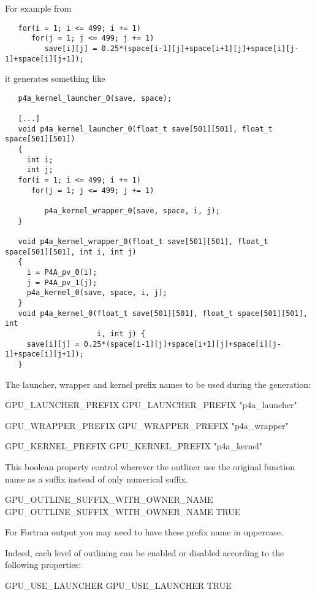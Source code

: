 \documentclass[a4paper]{report}
\begin{document}
For example from
\begin{lstlisting}
   for(i = 1; i <= 499; i += 1)
      for(j = 1; j <= 499; j += 1)
         save[i][j] = 0.25*(space[i-1][j]+space[i+1][j]+space[i][j-1]+space[i][j+1]);
\end{lstlisting}
it generates something like
\begin{lstlisting}
   p4a_kernel_launcher_0(save, space);

   [...]
   void p4a_kernel_launcher_0(float_t save[501][501], float_t space[501][501])
   {
     int i;
     int j;
   for(i = 1; i <= 499; i += 1)
      for(j = 1; j <= 499; j += 1)

         p4a_kernel_wrapper_0(save, space, i, j);
   }

   void p4a_kernel_wrapper_0(float_t save[501][501], float_t space[501][501], int i, int j)
   {
     i = P4A_pv_0(i);
     j = P4A_pv_1(j);
     p4a_kernel_0(save, space, i, j);
   }
   void p4a_kernel_0(float_t save[501][501], float_t space[501][501], int
                     i, int j) {
     save[i][j] = 0.25*(space[i-1][j]+space[i+1][j]+space[i][j-1]+space[i][j+1]);
   }
\end{lstlisting}


The launcher, wrapper and kernel prefix names to be used during the generation:
\begin{PipsProp}{GPU_LAUNCHER_PREFIX}
GPU_LAUNCHER_PREFIX "p4a_launcher"
\end{PipsProp}
\begin{PipsProp}{GPU_WRAPPER_PREFIX}
GPU_WRAPPER_PREFIX "p4a_wrapper"
\end{PipsProp}
\begin{PipsProp}{GPU_KERNEL_PREFIX}
GPU_KERNEL_PREFIX "p4a_kernel"
\end{PipsProp}

This boolean property control wherever the outliner use the original function
name as a suffix instead of only numerical suffix.

\begin{PipsProp}{GPU_OUTLINE_SUFFIX_WITH_OWNER_NAME}
GPU_OUTLINE_SUFFIX_WITH_OWNER_NAME TRUE
\end{PipsProp}


For Fortran output you may need to have these prefix name in uppercase.

Indeed, each level of outlining can be enabled or disabled according to
the following properties:
\begin{PipsProp}{GPU_USE_LAUNCHER}
GPU_USE_LAUNCHER TRUE
\end{PipsProp}
\end{document}
